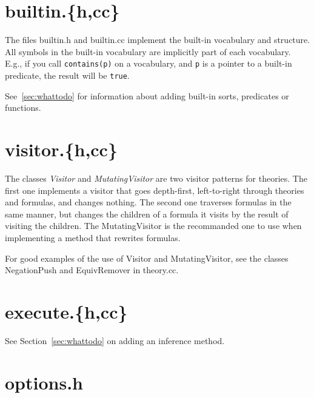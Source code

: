 \documentclass{article}
\begin{document}
\section{builtin.\{h,cc\}}

The files builtin.h and builtin.cc implement the built-in vocabulary and structure. All symbols in the built-in vocabulary are implicitly part of each vocabulary. E.g., if you call \texttt{contains(p)} on a vocabulary, and \texttt{p} is a pointer to a built-in predicate, the result will be \texttt{true}. 

See~\ref{sec:whattodo} for information about adding built-in sorts, predicates or functions.

\section{visitor.\{h,cc\}}

The classes \emph{Visitor} and \emph{MutatingVisitor} are two visitor patterns for theories. The first one implements a visitor that goes depth-first, left-to-right through theories and formulas, and changes nothing. The second one traverses formulas in the same manner, but changes the children of a formula it visits by the result of visiting the children. The MutatingVisitor is the recommanded one to use when implementing a method that rewrites formulas. 

For good examples of the use of Visitor and MutatingVisitor, see the classes NegationPush and EquivRemover in theory.cc.

\section{execute.\{h,cc\}}

See Section~\ref{sec:whattodo} on adding an inference method.

\section{options.h}
\end{document}
